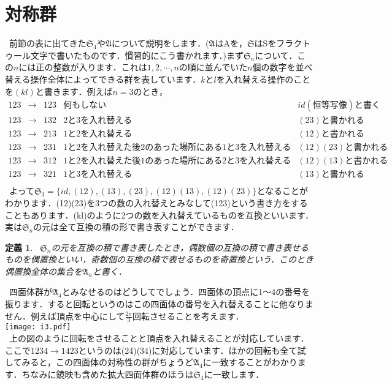 \documentclass{jreport}
\theoremstyle{idefinition}
\newtheorem{idefi}{定義}[section]
\begin{document}
\section{対称群}
\ 前節の表に出てきた$\mathfrak{S}_4$や$\mathfrak{A}$について説明をします．($\mathfrak{A}$はAを，$\mathfrak{S}$はSをフラクトゥール文字で書いたものです．慣習的にこう書かれます．)まず$\mathfrak{S}_n$について．この$n$には正の整数が入ります．これは$1,2,\cdots,n$の順に並んでいた$n$個の数字を並べ替える操作全体によってできる群を表しています．$k$と$l$を入れ替える操作のことを$(kl)$と書きます．例えば$n=3$のとき，
\[
\begin{array}{cccll}
123&\rightarrow&123&何もしない&id(恒等写像)と書く\\
123&\rightarrow&132&2と3を入れ替える&(23)と書かれる\\
123&\rightarrow&213&1と2を入れ替える&(12)と書かれる\\
123&\rightarrow&231&1と2を入れ替えた後2のあった場所にある1と3を入れ替える&(12)(23)と書かれる\\
123&\rightarrow&312&1と2を入れ替えた後1のあった場所にある2と3を入れ替える&(12)(13)と書かれる\\
123&\rightarrow&321&1と3を入れ替える&(13)と書かれる\\
\end{array}
\]
\ よって$\mathfrak{S}_3=\{id,(12),(13),(23),(12)(13),(12)(23)\}$となることがわかります．(12)(23)を3つの数の入れ替えとみなして(123)という書き方をすることもあります．(kl)のように2つの数を入れ替えているものを互換といいます．実は$\mathfrak{S}_n$の元は全て互換の積の形で書き表すことができます．\\

\begin{idefi}
\ $\mathfrak{S}_n$の元を互換の積で書き表したとき，偶数個の互換の積で書き表せるものを偶置換といい，奇数個の互換の積で表せるものを奇置換という．このとき偶置換全体の集合を$\mathfrak{A}_n$と書く．
\end{idefi}

\ 四面体群が$\mathfrak{A}_4$とみなせるのはどうしてでしょう．四面体の頂点に1～4の番号を振ります．すると回転というのはこの四面体の番号を入れ替えることに他なりません．例えば頂点を中心にして$\frac{2\pi}{3}$回転させることを考えます．\\
\texttt{[image: i3.pdf]}\\
\ 上の図のように回転をさせることと頂点を入れ替えることが対応しています．ここで$1234\rightarrow1423$というのは(24)(34)に対応しています．ほかの回転も全て試してみると，この四面体の対称性の群がちょうど$\mathfrak{A}_4$に一致することがわかります．ちなみに鏡映も含めた拡大四面体群のほうは$\mathfrak{S}_4$に一致します．\\
\end{document}
